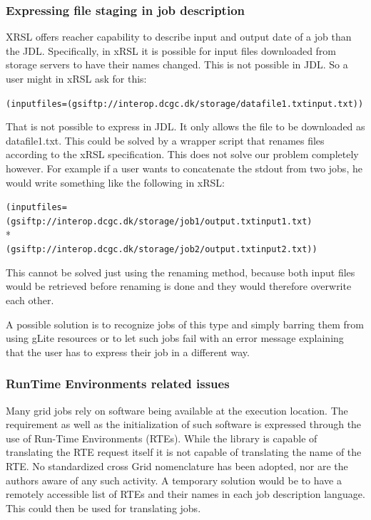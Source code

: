 \documentclass{article}
\begin{document}
\subsubsection*{Expressing file staging in job description}
XRSL  offers reacher capability to describe input and output date of a job than the JDL.  Speciﬁcally, in xRSL it is possible for input files downloaded from storage servers to have their names changed. This is not possible in JDL. So a user might in xRSL ask for this:
\begin{shaded}
\verb#(inputfiles=(gsiftp://interop.dcgc.dk/storage/datafile1.txtinput.txt))#
\end{shaded}
That is not possible to express in JDL. It only allows the file to be downloaded as datafile1.txt. This could be solved by a wrapper script that renames files according to the xRSL speciﬁcation. This does not solve our problem completely however. For example if a user wants to concatenate the stdout from two jobs, he would write something like the following in xRSL:
\begin{shaded}
\verb#(inputfiles=(gsiftp://interop.dcgc.dk/storage/job1/output.txtinput1.txt)#\\*
\verb#            (gsiftp://interop.dcgc.dk/storage/job2/output.txtinput2.txt))#
\end{shaded}
This cannot be solved just using the renaming method, because both input files would be retrieved before renaming is done and they would therefore overwrite each other.\par
A possible  solution is to recognize jobs of this type and simply barring them from using gLite resources or to let such jobs fail with an error message explaining that the user has to express their job in a different way.
\subsubsection*{RunTime Environments related issues}
Many grid jobs rely on software being available at the execution location. The requirement as well as the initialization of such software is expressed through the use of Run-Time Environments (RTEs). While the library is capable of translating the RTE request itself it is not capable of translating the name of the RTE. No standardized cross Grid nomenclature has been adopted, nor are the authors aware of any such activity. A temporary solution would be to have a remotely accessible list of RTEs and their names in each job description language. This could then be used for translating jobs.
\appendix
\end{document}
